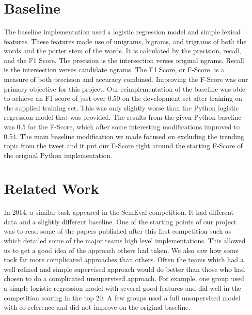 \documentclass[11pt,letterpaper]{article}
\begin{document}
\section{Baseline}
\paragraph{}
The baseline implementation used a logistic regression model and simple lexical features. These features made use of unigrams, bigrams, and trigrams of both the words and the porter stem of the words. It is calculated by the precision, recall, and the F1 Score. The precision is the intersection verses original ngrams. Recall is the intersection verses candidate ngrams. The F1 Score, or F-Score, is a measure of both precision and accuracy combined. Improving the F-Score was our primary objective for this project. Our reimplementation of the baseline was able to achieve an F1 score of just over 0.50 on the development set after training on the supplied training set. This was only slightly worse than the Python logistic regression model that was provided. The results from the given Python baseline was 0.5 for the F-Score, which after some interesting modifications improved to 0.54. The main baseline modification we made focused on excluding the trending topic from the tweet and it put our F-Score right around the starting F-Score of the original Python implementation.

\section{Related Work}
\paragraph{}
In 2014, a similar task appeared in the SemEval competition. It had different data and a slightly different baseline. One of the starting points of our project was to read some of the papers published after this first competition such as \cite{Divergent-Paraphrases} which detailed some of the major teams high level implementations. This allowed us to get a good idea of the approach others had taken. We also saw how some took far more complicated approaches than others. Often the teams which had a well refined and simple supervised approach would do better than those who had chosen to do a complicated unsupervised approach. For example, one group used a simple logistic regression model with several good features and did well in the competition scoring in the top 20. A few groups used a full unsupervised model with co-reference and did not improve on the original baseline.
\end{document}
